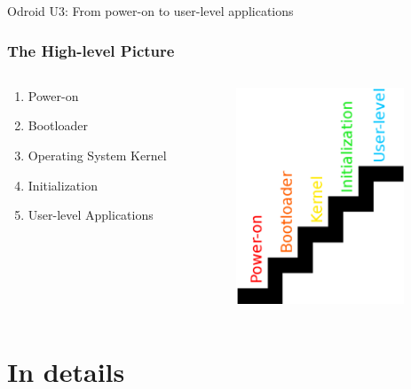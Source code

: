 \documentclass{beamer}
\begin{document}
\begin{frame}{Odroid U3: From power-on to user-level applications}
\frametitle{The High-level Picture}
  \begin{columns}[C] %
    \begin{column}{5cm} %
      \begin{enumerate}
      \item Power-on
      \item Bootloader
      \item Operating System Kernel
      \item Initialization
      \item User-level Applications
      \end{enumerate}
    \end{column}
    \begin{column}{5cm} %
      \includegraphics[width=5cm]{images/aiga_stairs_2.eps}
    \end{column}
  \end{columns}
\end{frame}

\section{In details}
\end{document}
